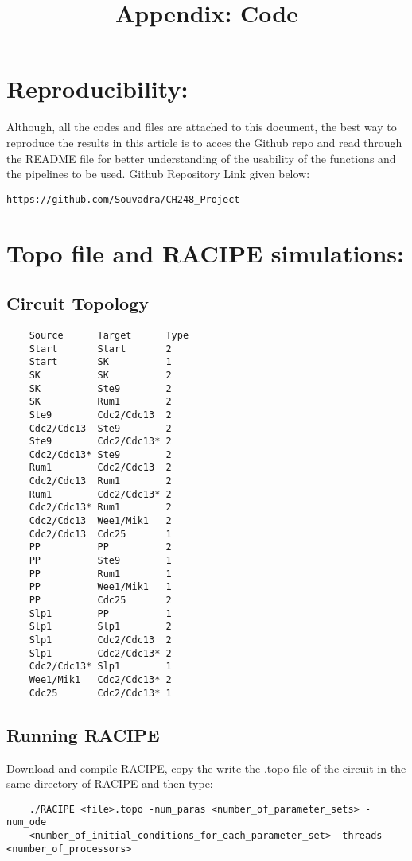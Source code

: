 \documentclass{article}
\title{Appendix: Code}
\begin{document}
\maketitle %

\section*{Reproducibility:} Although, all the codes and files are attached to this 
document, the best way to reproduce the results in this article is to acces the Github 
repo and read through the README file for better understanding of the usability of 
the functions and the pipelines to be used.
\newline \newline
Github Repository Link given below: \begin{verbatim}https://github.com/Souvadra/CH248_Project\end{verbatim}
\section*{Topo file and RACIPE simulations:}
\subsection*{Circuit Topology}
\begin{verbatim}
    Source	    Target	    Type
    Start       Start       2
    Start       SK          1 
    SK          SK          2
    SK          Ste9        2
    SK          Rum1        2 
    Ste9        Cdc2/Cdc13  2 
    Cdc2/Cdc13  Ste9        2 
    Ste9        Cdc2/Cdc13* 2 
    Cdc2/Cdc13* Ste9        2 
    Rum1        Cdc2/Cdc13  2 
    Cdc2/Cdc13  Rum1        2 
    Rum1        Cdc2/Cdc13* 2 
    Cdc2/Cdc13* Rum1        2 
    Cdc2/Cdc13  Wee1/Mik1   2 
    Cdc2/Cdc13  Cdc25       1
    PP          PP          2 
    PP          Ste9        1
    PP          Rum1        1 
    PP          Wee1/Mik1   1 
    PP          Cdc25       2
    Slp1        PP          1 
    Slp1        Slp1        2 
    Slp1        Cdc2/Cdc13  2
    Slp1        Cdc2/Cdc13* 2
    Cdc2/Cdc13* Slp1        1 
    Wee1/Mik1   Cdc2/Cdc13* 2
    Cdc25       Cdc2/Cdc13* 1
\end{verbatim}

\subsection*{Running RACIPE}
Download and compile RACIPE, copy the write the .topo file of the circuit in the same
directory of RACIPE and then type:
\begin{verbatim}
    ./RACIPE <file>.topo -num_paras <number_of_parameter_sets> -num_ode 
    <number_of_initial_conditions_for_each_parameter_set> -threads <number_of_processors>
\end{verbatim}
\end{document}
